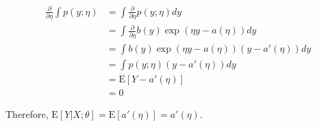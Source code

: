 \begin{answer}
	$$
	\begin{aligned}
		\frac{\partial}{\partial\eta} \int p(y;\eta) & = \int \frac{\partial}{\partial\eta} p(y;\eta) dy\\
		& = \int \frac{\partial}{\partial\eta} b(y)\exp(\eta y - a(\eta)) dy\\
		& = \int b(y) \exp(\eta y - a(\eta)) (y - a'(\eta)) dy\\
		& = \int p(y; \eta)(y - a'(\eta)) dy\\
		& = \mathrm E[Y - a'(\eta)]\\
		& = 0
	\end{aligned}
	$$
	
	Therefore, $\mathrm E[Y | X; \theta] = \mathrm E[a'(\eta)] = a'(\eta)$.
\end{answer}